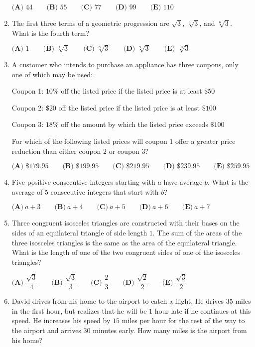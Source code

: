 \documentclass{article}
\begin{document}
\begin{enumerate}[label=\arabic*., itemsep=0.5em]
$\textbf{(A) }44\qquad
\textbf{(B) }55\qquad
\textbf{(C) }77\qquad
\textbf{(D) }99\qquad
\textbf{(E) }110$\par \vspace{0.5em}\item The first three terms of a geometric progression are $\sqrt 3$, $\sqrt[3]3$, and $\sqrt[6]3$.  What is the fourth term?

$\textbf{(A) }1\qquad
\textbf{(B) }\sqrt[7]3\qquad
\textbf{(C) }\sqrt[8]3\qquad
\textbf{(D) }\sqrt[9]3\qquad
\textbf{(E) }\sqrt[10]3\qquad$\par \vspace{0.5em}\item A customer who intends to purchase an appliance has three coupons, only one of which may be used:

Coupon 1: $10\%$ off the listed price if the listed price is at least $\$50$

Coupon 2: $\$20$ off the listed price if the listed price is at least $\$100$

Coupon 3: $18\%$ off the amount by which the listed price exceeds $\$100$

For which of the following listed prices will coupon $1$ offer a greater price reduction than either coupon $2$ or coupon $3$?

$\textbf{(A) }\$179.95\qquad
\textbf{(B) }\$199.95\qquad
\textbf{(C) }\$219.95\qquad
\textbf{(D) }\$239.95\qquad
\textbf{(E) }\$259.95\qquad$\par \vspace{0.5em}\item Five positive consecutive integers starting with $a$ have average $b$. What is the average of $5$ consecutive integers that start with $b$?

$ \textbf{(A)}\ a+3\qquad\textbf{(B)}\ a+4\qquad\textbf{(C)}\ a+5\qquad\textbf{(D)}\ a+6\qquad\textbf{(E)}\ a+7$\par \vspace{0.5em}\item Three congruent isosceles triangles are constructed with their bases on the sides of an equilateral triangle of side length $1$.  The sum of the areas of the three isosceles triangles is the same as the area of the equilateral triangle.  What is the length of one of the two congruent sides of one of the isosceles triangles?

$\textbf{(A) }\dfrac{\sqrt3}4\qquad
\textbf{(B) }\dfrac{\sqrt3}3\qquad
\textbf{(C) }\dfrac23\qquad
\textbf{(D) }\dfrac{\sqrt2}2\qquad
\textbf{(E) }\dfrac{\sqrt3}2$\par \vspace{0.5em}\item David drives from his home to the airport to catch a flight.  He drives $35$ miles in the first hour, but realizes that he will be $1$ hour late if he continues at this speed.  He increases his speed by $15$ miles per hour for the rest of the way to the airport and arrives $30$ minutes early.  How many miles is the airport from his home?


\end{enumerate}
\end{document}
